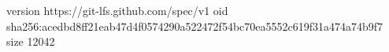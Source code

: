 version https://git-lfs.github.com/spec/v1
oid sha256:acedbd8ff21eab47d4f0574290a522472f54bc70ea5552c619f31a474a74b9f7
size 12042
